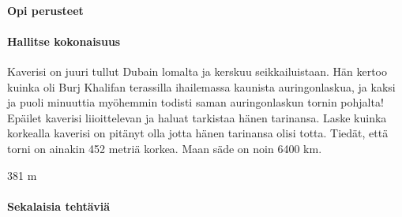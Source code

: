 \begin{tehtavasivu}

\paragraph*{Opi perusteet}

\paragraph*{Hallitse kokonaisuus}
  \begin{tehtava}
	Kaverisi on juuri tullut Dubain lomalta ja kerskuu seikkailuistaan. Hän kertoo kuinka oli Burj Khalifan terassilla ihailemassa kaunista auringonlaskua, ja kaksi ja puoli minuuttia myöhemmin todisti saman auringonlaskun tornin pohjalta! Epäilet kaverisi liioittelevan ja haluat tarkistaa hänen tarinansa. Laske kuinka korkealla kaverisi on pitänyt olla jotta hänen tarinansa olisi totta. Tiedät, että torni on ainakin 452 metriä korkea. Maan säde on noin 6400 km.
	\begin{vastaus}
	381 m
  	\end{vastaus}
  \end{tehtava}
\paragraph*{Sekalaisia tehtäviä}

\end{tehtavasivu}


